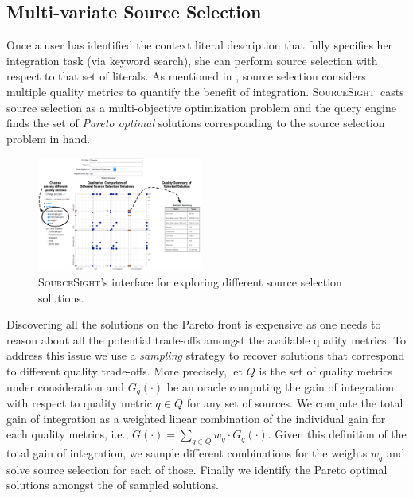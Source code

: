 \documentclass{vldb}
\newcommand\system{\textsc{SourceSight}}
\begin{document}
\subsection{Multi-variate Source Selection}
\label{sec:sourcesel}
Once a user has identified the context literal description that fully specifies her integration task (via keyword search), she can perform source selection with respect to that set of literals. As mentioned in , source selection considers multiple quality metrics to quantify the benefit of integration. \system~casts source selection as a multi-objective optimization problem and the query engine finds the set of {\em Pareto optimal} solutions corresponding to the source selection problem in hand. 

\begin{figure}
	\begin{center}
	\includegraphics[trim=0 0 0 85, clip,width=0.48\textwidth]{fig/ssResults}
	\caption{\system's interface for exploring different source selection solutions.}
	\label{fig:ssresults}
	\end{center}
\end{figure}

Discovering all the solutions on the Pareto front is expensive as one needs to reason about all the potential trade-offs amongst the available quality metrics. To address this issue we use a {\em sampling} strategy to recover solutions that correspond to different quality trade-offs. More precisely, let $Q$ is the set of quality metrics under consideration and $G_q(\cdot)$ be an oracle computing the gain of integration with respect to quality metric $q \in Q$ for any set of sources. We compute the total gain of integration as a weighted linear combination of the individual gain for each quality metrics, i.e., $G(\cdot) = \sum_{q \in Q} w_q \cdot G_q(\cdot)$. Given this definition of the total gain of integration, we sample different combinations for the weights $w_q$ and solve source selection for each of those. Finally we identify the Pareto optimal solutions amongst the of sampled solutions. 
\end{document}

